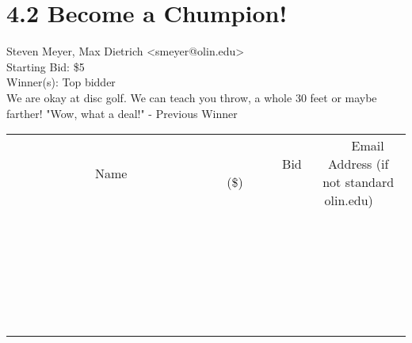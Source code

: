 \documentclass[11pt]{article}
\begin{document}
					\section*{4.2 Become a Chumpion!}
					Steven Meyer, Max Dietrich <smeyer@olin.edu> \\
					Starting Bid: \$5 \\
					Winner(s): Top bidder \\
					We are okay at disc golf. We can teach you throw, a whole 30 feet or maybe farther! "Wow, what a deal!" - Previous Winner \\
					[6ex]
					\begin{tabular}{c c c}
						~~~~~~~~~~~~~Name~~~~~~~~~~~~~ & ~~~~~~~~~Bid (\$)~~~~~~~~~ & ~~~Email Address (if not standard olin.edu)~~~ \\
				
 & & \\
\hline
 & & \\
\hline
 & & \\
\hline
 & & \\
\hline
 & & \\
\hline
 & & \\
\hline
 & & \\
\hline
 & & \\
\hline
 & & \\
\hline
 & & \\
\hline
 & & \\
\hline
 & & \\
\hline
 & & \\
\hline
 & & \\
\hline
 & & \\
\hline
 & & \\
\hline
 & & \\
\hline
 & & \\
\hline
 & & \\
\hline
 & & \\
\hline
 & & \\
\hline
 & & \\
\hline
 & & \\
\hline
 & & \\
\hline
 & & \\
\hline
 & & \\
\hline
					\end{tabular}
					\clearpage
				
\end{document}
